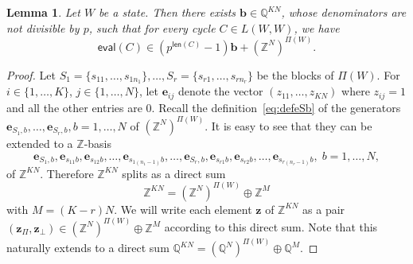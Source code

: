 \documentclass[letterpaper, 11pt, thm-restate]{article}
\numberwithin{equation}{section}
\newcommand{\Z}{\mathbb{Z}}
\newcommand{\N}{\mathbb{N}}
\newcommand{\Q}{\mathbb{Q}}
\newcommand{\bb}{\boldsymbol{b}}
\newcommand{\be}{\boldsymbol{e}}
\newcommand{\bz}{\boldsymbol{z}}
\newcommand{\len}{\mathsf{len}}
\newcommand{\eval}{\mathsf{eval}}
\newtheorem{lem}[thrm]{Lemma}
\theoremstyle{definition}
\theoremstyle{definition}
\theoremstyle{definition}
\begin{document}
\begin{lem}\label{lem:WW}
    Let $W$ be a state. %
    Then there exists $\bb \in \Q^{KN}$, whose denominators are not divisible by $p$, such that for every cycle $C \in L(W, W)$, we have
    \begin{equation}\label{eq:evalCin}
    \eval(C) \in \left(p^{\len(C)} - 1\right) \bb + (\Z^N)^{\Pi(W)}.
    \end{equation}
\end{lem}
\begin{proof}
    Let $S_1 = \{s_{11}, \ldots, s_{1 n_1}\}, \ldots, S_r = \{s_{r1}, \ldots, s_{r n_r}\}$ be the blocks of $\Pi(W)$.
    For $i \in \{1, \ldots, K\}$, $j \in \{1, \ldots, N\}$, let $\be_{ij}$ denote the vector $(z_{11}, \ldots, z_{KN})$ where $z_{ij} = 1$ and all the other entries are $0$.
    Recall the definition~\eqref{eq:defeSb} of the generators $\be_{S_1, b}, \ldots, \be_{S_r, b}, b = 1, \ldots, N$ of $(\Z^N)^{\Pi(W)}$.
    It is easy to see that they can be extended to a $\Z$-basis
    \[
    \be_{S_1, b}, \be_{s_{11}b}, \be_{s_{12}b}, \ldots,\be_{s_{1(n_1 - 1)}b}, \ldots, \be_{S_r, b}, \be_{s_{r1}b}, \be_{s_{r2}b}, \ldots,\be_{s_{r(n_r - 1)}b}, \; b = 1, \ldots, N,
    \]
    of $\Z^{KN}$.
    Therefore $\Z^{KN}$ splits as a direct sum 
    \begin{equation*}
    \Z^{KN} = (\Z^N)^{\Pi(W)} \oplus \Z^M
    \end{equation*}
    with $M = (K - r)N$.
    We will write each element $\bz$ of $\Z^{KN}$ as a pair $(\bz_{\Pi}, \bz_{\perp}) \in (\Z^N)^{\Pi(W)} \oplus \Z^M$ according to this direct sum.
    Note that this naturally extends to a direct sum $\Q^{KN} = (\Q^N)^{\Pi(W)} \oplus \Q^M$.



\end{proof}
\end{document}
